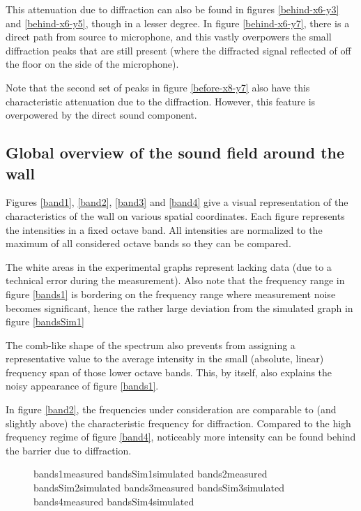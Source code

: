 This attenuation due to diffraction can also be found in figures \ref{behind-x6-y3} and \ref{behind-x6-y5}, though in a lesser degree. In figure \ref{behind-x6-y7}, there is a direct path from source to microphone, and this vastly overpowers the small diffraction peaks that are still present (where the diffracted signal reflected of off the floor on the side of the microphone).

Note that the second set of peaks in figure \ref{before-x8-y7} also have this characteristic attenuation due to the diffraction. However, this feature is overpowered by the direct sound component.




\subsection{Global overview of the sound field around the wall}
Figures \ref{band1}, \ref{band2}, \ref{band3} and \ref{band4} give a visual representation of the characteristics of the wall on various spatial coordinates. Each figure represents the intensities in a fixed octave band. All intensities are normalized to the maximum of all considered octave bands so they can be compared.

The white areas in the experimental graphs represent lacking data (due to a technical error during the measurement). Also note that the frequency range in figure \ref{bands1} is bordering on the frequency range where measurement noise becomes significant, hence the rather large deviation from the simulated graph in figure \ref{bandsSim1}

The comb-like shape of the spectrum also prevents from assigning a representative value to the average intensity in the small (absolute, linear) frequency span of those lower octave bands. This, by itself, also explains the noisy appearance of figure \ref{bands1}.

In figure \ref{band2}, the frequencies under consideration are comparable to (and slightly above) the characteristic frequency for diffraction. Compared to the high frequency regime of figure \ref{band4}, noticeably more intensity can be found behind the barrier due to diffraction.


\begin{figure}
	{bands1}{measured}
	{bandsSim1}{simulated}
	{bands2}{measured}
	{bandsSim2}{simulated}
	{bands3}{measured}
	{bandsSim3}{simulated}
	{bands4}{measured}
	{bandsSim4}{simulated}
\end{figure}





